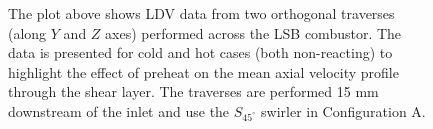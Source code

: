 \begin{figure}

\centering



\caption[Effect of temperature on the LSB flow field - II]{The plot above shows LDV data from two orthogonal traverses (along \(Y\) and \(Z\) axes) performed across the LSB combustor. The data is presented for cold and hot cases (both non-reacting) to highlight the effect of preheat on the mean axial velocity profile through the shear layer. The traverses are performed 15 mm downstream of the inlet and use the \(S_{45^\circ}\) swirler in Configuration A.}

\label{fig:temperatureLDVTransverse}

\end{figure}

